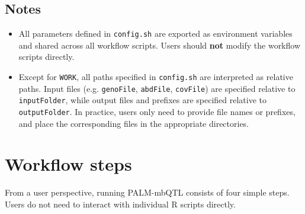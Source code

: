 \documentclass[11pt]{article}
\begin{document}
\subsection*{Notes}
\begin{itemize}
  \item All parameters defined in \texttt{config.sh} are exported as environment variables
and shared across all workflow scripts.
Users should \textbf{not} modify the workflow scripts directly.
  \item Except for \texttt{WORK}, all paths specified in \texttt{config.sh} are
interpreted as relative paths.
Input files (e.g. \texttt{genoFile}, \texttt{abdFile}, \texttt{covFile})
are specified relative to \texttt{inputFolder}, while output files and
prefixes are specified relative to \texttt{outputFolder}.
In practice, users only need to provide file names or prefixes, and place
the corresponding files in the appropriate directories.
\end{itemize}



\section{Workflow steps}

From a user perspective, running PALM-mbQTL consists of four simple steps.
Users do not need to interact with individual R scripts directly.
\end{document}
